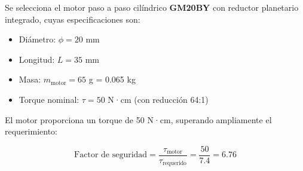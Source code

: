 Se selecciona el motor paso a paso cilíndrico \textbf{GM20BY} con reductor planetario integrado, cuyas especificaciones son:

\begin{itemize}
    \item Diámetro: $\phi = 20$ mm
    \item Longitud: $L = 35$ mm
    \item Masa: $m_{\text{motor}} = 65$ g = 0.065 kg
    \item Torque nominal: $\tau = 50$ N·cm (con reducción 64:1)
\end{itemize}

El motor proporciona un torque de 50 N·cm, superando ampliamente el requerimiento:

\begin{equation}
\text{Factor de seguridad} = \frac{\tau_{\text{motor}}}{\tau_{\text{requerido}}} = \frac{50}{7.4} = 6.76
\end{equation}
